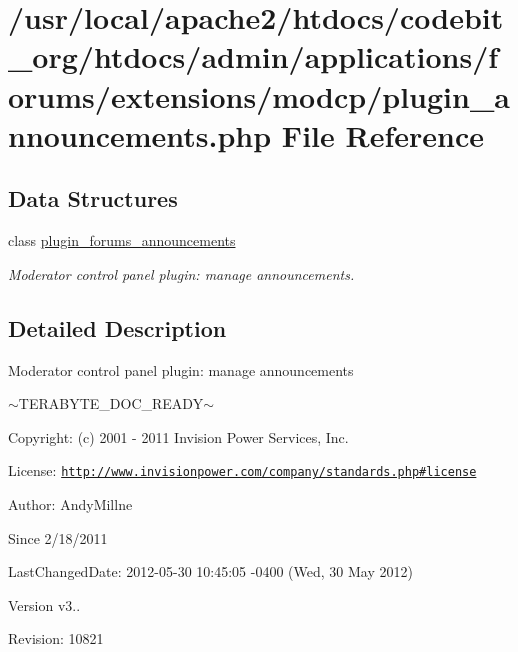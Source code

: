 \hypertarget{plugin__announcements_8php}{\section{/usr/local/apache2/htdocs/codebit\-\_\-org/htdocs/admin/applications/forums/extensions/modcp/plugin\-\_\-announcements.php File Reference}
\label{plugin__announcements_8php}
}
\subsection*{Data Structures}
\begin{DoxyCompactItemize}
\item 
class \hyperlink{classplugin__forums__announcements}{plugin\-\_\-forums\-\_\-announcements}
\begin{DoxyCompactList}\small\item\em Moderator control panel plugin\-: manage announcements. \end{DoxyCompactList}\end{DoxyCompactItemize}


\subsection{Detailed Description}
\begin{DoxyVerb}  Moderator control panel plugin: manage announcements
\end{DoxyVerb}
 $\sim$\-T\-E\-R\-A\-B\-Y\-T\-E\-\_\-\-D\-O\-C\-\_\-\-R\-E\-A\-D\-Y$\sim$ \begin{DoxyParagraph}{Copyright\-:}
(c) 2001 -\/ 2011 Invision Power Services, Inc.
\end{DoxyParagraph}
\begin{DoxyParagraph}{License\-:}
\href{http://www.invisionpower.com/company/standards.php#license}{\tt http\-://www.\-invisionpower.\-com/company/standards.\-php\#license}
\end{DoxyParagraph}
\begin{DoxyParagraph}{Author\-:}
Andy\-Millne 
\end{DoxyParagraph}
\begin{DoxySince}{Since}
2/18/2011 
\end{DoxySince}
\begin{DoxyParagraph}{Last\-Changed\-Date\-:}
2012-\/05-\/30 10\-:45\-:05 -\/0400 (Wed, 30 May 2012) 
\end{DoxyParagraph}
\begin{DoxyVersion}{Version}
v3.. 
\end{DoxyVersion}
\begin{DoxyParagraph}{Revision\-:}
10821 
\end{DoxyParagraph}
